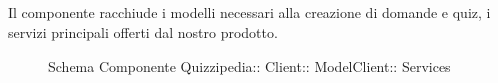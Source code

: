 \subsection{}
Il componente racchiude i modelli necessari alla creazione di domande e quiz, i servizi principali offerti dal nostro prodotto.
\begin{figure}[H]
\centering
\noindent{}
\caption[Schema Componente Services]{Schema Componente Quizzipedia:: Client:: ModelClient:: Services}
\end{figure}
